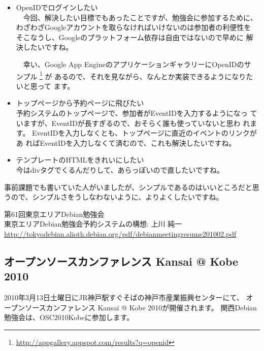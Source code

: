 \documentclass[mingoth,a4paper]{jsarticle}
\begin{document}
\begin{itemize}
 \item OpenIDでログインしたい \\
       　今回、解決したい目標でもあったことですが、勉強会に参加するために、
       わざわざGoogleアカウントを取らなければいけないのは参加者の利便性を
       そこなうし、Googleのプラットフォーム依存は自由ではないので早めに
       解決したいですね。
       
       　幸い、Google App EngineのアプリケーションギャラリーにOpenIDのサ
       ンプル
       \footnote{\url{http://appgallery.appspot.com/results?q=openid}} が
       あるので、それを見ながら、なんとか実装できるようになりたいと思って
       ます。\\

 \item トップページから予約ページに飛びたい \\
       予約システムのトップページで、参加者がEventIDを入力するようになっ
       ていますが、EventIDが長すぎるので、おそらく誰も使っていないと思わ
       れます。
       EventIDを入力しなくとも、トップページに直近のイベントのリンクがあ
       ればEventIDを入力しなくて済むので、これも解決したいですね。\\

 \item テンプレートのHTMLをきれいにしたい \\
       今はdivタグでくるんだりして、あらっぽいので直したいですね。
\end{itemize}

事前課題でも書いていた人がいましたが、シンプルであるのはいいところだと思
うので、シンプルさをうしなわないように、よりよくしたいですね。

\begin{thebibliography}{99}
         第61回東京エリアDebian勉強会 \\
         東京エリアDebian勉強会予約システムの構想: 上川 純一 \\
         \url{http://tokyodebian.alioth.debian.org/pdf/debianmeetingresume201002.pdf}
\end{thebibliography}



\subsection{オープンソースカンファレンス Kansai @ Kobe 2010}

2010年3月13日土曜日にJR神戸駅すぐそばの神戸市産業振興センターにて、
オープンソースカンファレンス Kansai @ Kobe 2010が開催されます。
関西Debian勉強会は、OSC2010Kobeに参加します。
\end{document}
